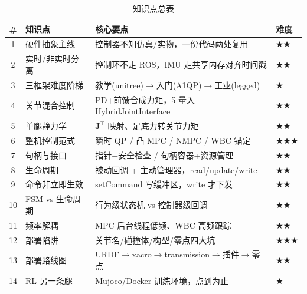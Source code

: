 \begin{table}[H]\centering\small
\caption{知识点总表}
\begin{tabular}{clll}
\toprule
\# & 知识点 & 核心要点 & 难度 \\
\midrule
1 & 硬件抽象主线 & 控制器不知仿真/实物，一份代码两处复用 & \(\bigstar\bigstar\) \\
2 & 实时/非实时分离 & 控制环不走 ROS，IMU 走共享内存对齐时间戳 & \(\bigstar\bigstar\) \\
3 & 三框架难度阶梯 & 教学(unitree)$\to$入门(A1QP)$\to$工业(legged) & \(\bigstar\) \\
4 & 关节混合控制 & PD+前馈合成力矩，5 量入 HybridJointInterface & \(\bigstar\bigstar\) \\
5 & 单腿静力学 & $\mathbf{J}^\top$ 映射、足底力转关节力矩 & \(\bigstar\bigstar\) \\
6 & 整机控制范式 & 瞬时 QP / 凸 MPC / NMPC / WBC 锚定 & \(\bigstar\bigstar\bigstar\) \\
7 & 句柄与接口 & 指针+安全检查 / 句柄容器+资源管理 & \(\bigstar\bigstar\) \\
8 & 生命周期 & 被动回调 + 主动管理器，read/update/write & \(\bigstar\bigstar\) \\
9 & 命令非立即生效 & setCommand 写缓冲区，write 才下发 & \(\bigstar\bigstar\) \\
10 & FSM vs 生命周期 & 行为级状态机 vs 控制器级回调 & \(\bigstar\bigstar\) \\
11 & 频率解耦 & MPC 后台线程低频、WBC 高频跟踪 & \(\bigstar\bigstar\) \\
12 & 部署陷阱 & 关节名/碰撞体/构型/零点四大坑 & \(\bigstar\bigstar\bigstar\) \\
13 & 部署路线图 & URDF$\to$xacro$\to$transmission$\to$插件$\to$零点 & \(\bigstar\bigstar\) \\
14 & RL 另一条腿 & Mujoco/Docker 训练环境，点到为止 & \(\bigstar\) \\
\bottomrule
\end{tabular}
\end{table}

